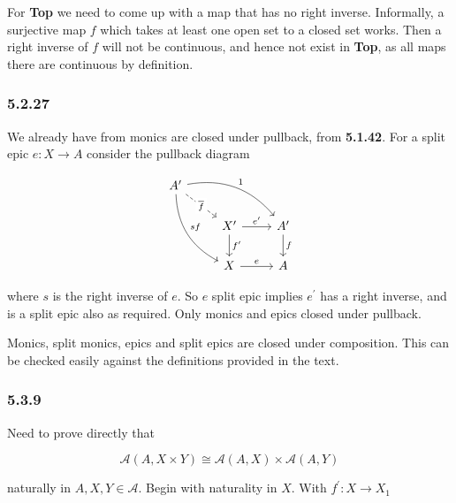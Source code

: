 \documentclass{article}
\begin{document}
For \textbf{Top} we need to come up with a map that has no right inverse. Informally, a surjective map $f$ which takes at least one open set to a closed set works. Then a right inverse of $f$ will not be continuous, and hence not exist in \textbf{Top}, as all maps there are continuous by definition.

\subsubsection*{5.2.27}

We already have from monics are closed under pullback, from \textbf{5.1.42}. For a split epic $e\colon X \rightarrow A$ consider the pullback diagram

\begin{equation*}
\begin{tikzcd}
A^\prime
\arrow[drr, bend left, "1"]
\arrow[ddr, bend right, "sf"]
\arrow[dr, dashed, "\overline{f}" description] & \\
& X^\prime \arrow[r, "e^\prime"] \arrow[d, "f^\prime"]
& A^\prime \arrow[d,"f"] \\
& X \arrow[r, "e"]
& A
\end{tikzcd}
\end{equation*}

where $s$ is the right inverse of $e$. So $e$ split epic implies $e^\prime$ has a right inverse, and is a split epic also as required. Only monics and epics closed under pullback.

Monics, split monics, epics and split epics are closed under composition. This can be checked easily against the definitions provided in the text.

\subsubsection*{5.3.9}

Need to prove directly that

\begin{equation*}
\mathcal{A}(A, X \times Y) \cong \mathcal{A}(A,X) \times \mathcal{A}(A,Y)
\end{equation*}

naturally in $A, X, Y \in \mathcal{A}$. Begin with naturality in $X$. With $f^\prime \colon X \rightarrow X_1$
\end{document}
